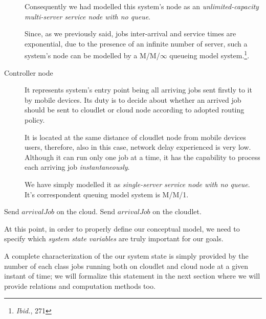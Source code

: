 \documentclass[10pt,a4paper]{article}
\begin{document}
\begin{description}
Consequently we had modelled this system's node as an \textit{unlimited-capacity multi-server service node with no queue}. 

Since, as we previously said, jobs inter-arrival and service times are exponential, due to the presence of an infinite number of server, such a system's node can be modelled by  a M/M/$\infty$ queueing model system.\footnote{\textit{Ibid.}, 271}. 


\item[Controller node] It represents system's entry point being all arriving jobs sent firstly to it by mobile devices. Its duty is to decide about whether an arrived job should be sent to cloudlet or cloud node according to adopted routing policy.

It is located at the same distance of cloudlet node from mobile devices users, therefore, also in this case, network delay experienced is very low. Although it can run only one job at a time, it has the capability to process each arriving job \textit{instantaneously}. 

We have simply modelled it as \textit{single-server service node with no queue}. It's correspondent queuing model system is M/M/1.

\end{description}




\begin{algorithm}

\caption{}\label{alg:accessControlAlgorithm1}

\begin{algorithmic}[1]


	\State Send $\textit{arrivalJob}$ on the cloud.
\Else 	
 	\State Send $\textit{arrivalJob}$ on the cloudlet.
\EndIf

\EndFunction

\end{algorithmic}
\end{algorithm}

At this point, in order to properly define our conceptual model, we need to specify which \textit{system state variables} are truly important for our goals.

A complete characterization of the our system state is simply provided by the number of each class jobs running both on cloudlet and cloud node at a given instant of time; we will formalize this statement in the next section where we will provide relations and computation methods too. 
\end{document}
